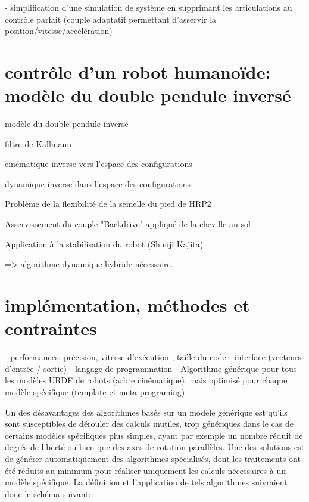 \documentclass{report}
\begin{document}
	- simplification d'une simulation de système en supprimant les articulations au contrôle parfait (couple adaptatif permettant d'asservir la position/vitesse/accélération)


\section{contrôle d'un robot humanoïde: modèle du double pendule inversé}

modèle du double pendule inversé

filtre de Kallmann

cinématique inverse vers l'espace des configurations

dynamique inverse dans l'espace des configurations

Problème de la flexibilité de la semelle du pied de HRP2

Asservissement du couple "Backdrive" appliqué de la cheville au sol

Application à la stabilisation du robot (Shuuji Kajita)

=> algorithme dynamique hybride nécessaire.

\section{implémentation, méthodes et contraintes} \label{ch_concepts_implEtContr}
- performances: précision, vitesse d'exécution , taille du code\vspace{0.3cm}
- interface (vecteurs d'entrée / sortie)\vspace{0.3cm}
- langage de programmation\vspace{0.3cm}
- Algorithme générique pour tous les modèles URDF de robots (arbre cinématique), mais optimisé pour chaque modèle spécifique (template et meta-programing)\vspace{0.3cm}

Un des désavantages des algorithmes basés sur un modèle générique est qu'ils sont susceptibles de dérouler des calculs inutiles, trop génériques dans le cas de certains modèles spécifiques plus simples, ayant par exemple un nombre réduit de degrés de liberté ou bien que des axes de rotation parallèles. Une des solutions est de générer automatiquement des algorithmes spécialisés, dont les traitements ont été réduits au minimum pour réaliser uniquement les calculs nécessaires à un modèle spécifique. La définition et l'application de tels algorithmes suivraient donc le schéma suivant:
\end{document}
